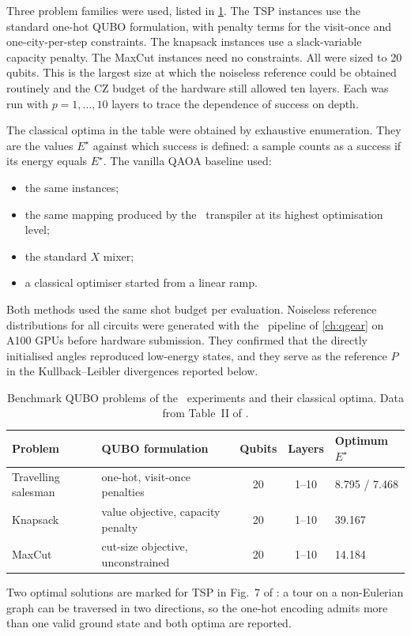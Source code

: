 Three problem families were used, listed in \cref{tab:nisq:problems}. The TSP instances use the standard one-hot QUBO formulation, with penalty terms for the visit-once and one-city-per-step constraints. The knapsack instances use a slack-variable capacity penalty. The MaxCut instances need no constraints. All were sized to 20 qubits. This is the largest size at which the noiseless reference could be obtained routinely and the CZ budget of the hardware still allowed ten layers. Each was run with $p=1,\dots,10$ layers to trace the dependence of success on depth.

The classical optima in the table were obtained by exhaustive enumeration. They are the values $E^{\star}$ against which success is defined: a sample counts as a success if its energy equals $E^{\star}$. The vanilla QAOA baseline used:
\begin{itemize}
\item the same instances;
\item the same mapping produced by the \qiskit\ transpiler at its highest optimisation level;
\item the standard $X$ mixer;
\item a classical optimiser started from a linear ramp.
\end{itemize}
Both methods used the same shot budget per evaluation. Noiseless reference distributions for all circuits were generated with the \qgear\ pipeline of \cref{ch:qgear} on A100 GPUs before hardware submission. They confirmed that the directly initialised angles reproduced low-energy states, and they serve as the reference $P$ in the Kullback--Leibler divergences reported below.

\begin{table}[htbp]
\caption{Benchmark QUBO problems of the \deal\ experiments and their classical optima. Data from Table~II of \cite{guo2025deal}.}
\label{tab:nisq:problems}
\centering\small
\begin{threeparttable}
\begin{tabular}{@{}llccl@{}}
\toprule
Problem & QUBO formulation & Qubits & Layers & Optimum $E^{\star}$ \\
\midrule
Travelling salesman & one-hot, visit-once penalties & 20 & 1--10 & 8.795 / 7.468\tnote{a} \\
Knapsack            & value objective, capacity penalty & 20 & 1--10 & 39.167 \\
MaxCut              & cut-size objective, unconstrained & 20 & 1--10 & 14.184 \\
\bottomrule
\end{tabular}
\begin{tablenotes}\footnotesize
\item[a] Two optimal solutions are marked for TSP in Fig.~7 of \cite{guo2025deal}: a tour on a non-Eulerian graph can be traversed in two directions, so the one-hot encoding admits more than one valid ground state and both optima are reported.
\end{tablenotes}
\end{threeparttable}
\end{table}

